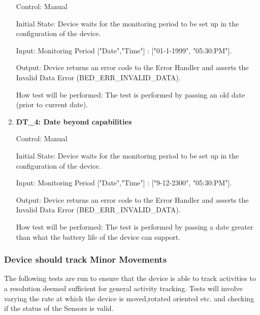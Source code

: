 \documentclass[12pt, titlepage]{article}
\begin{document}
\begin{enumerate}
		Control: Manual 
							
		Initial State: Device waits for the monitoring period to be set up in the configuration of the device.
							
		Input: Monitoring Period ["Date","Time"] : ["01-1-1999", "05:30:PM"].
							
		Output: Device returns an error code to the Error Handler and asserts the Invalid Data Error (BED\_ERR\_INVALID\_DATA).
		
		How test will be performed: The test is performed by passing an old date (prior to current date).

	\item{\textbf{DT\_4: Date beyond capabilities}\\}\label{DT4}
		
		Control: Manual 
							
		Initial State: Device waits for the monitoring period to be set up in the configuration of the device.
							
		Input: Monitoring Period ["Date","Time"] : ["9-12-2300", "05:30:PM"].
							
		Output: Device returns an error code to the Error Handler and asserts the Invalid Data Error (BED\_ERR\_INVALID\_DATA).

		How test will be performed: The test is performed by passing a date greater than what the battery life of the device can support.

\end{enumerate}

\subsubsection{Device should track Minor Movements}
The following tests are run to ensure that the device is able to track activities to a resolution deemed sufficient for general activity tracking. Tests will involve varying the rate at which the device is moved,rotated oriented etc. and checking if the status of the Sensors is valid.
\end{document}
